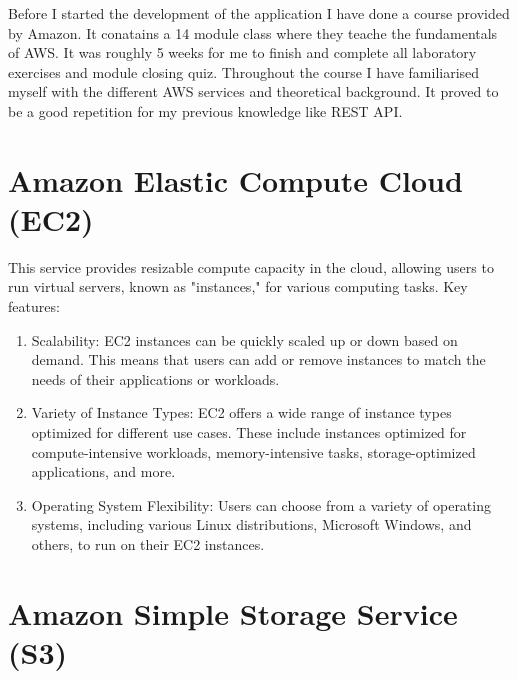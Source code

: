 \documentclass[11pt,a4paper,oneside]{report}
\begin{document}
Before I started the development of the application I have done a course provided by Amazon. It conatains a 14 module class where they teache the fundamentals of AWS.
It was roughly 5 weeks for me to finish and complete all laboratory exercises and module closing quiz. Throughout the course I have familiarised myself with the different AWS services and theoretical background. It proved to be a good repetition for my previous knowledge like REST API. \cite{awsacademy}


\section{Amazon Elastic Compute Cloud (EC2)}

This service provides resizable compute capacity in the cloud, allowing users to run virtual servers, known as "instances," for various computing tasks.
Key features:
\begin{enumerate}
  \item Scalability: EC2 instances can be quickly scaled up or down based on demand. This means that users can add or remove instances to match the needs of their applications or workloads.
  \item Variety of Instance Types: EC2 offers a wide range of instance types optimized for different use cases. These include instances optimized for compute-intensive workloads, memory-intensive tasks, storage-optimized applications, and more.
  \item Operating System Flexibility: Users can choose from a variety of operating systems, including various Linux distributions, Microsoft Windows, and others, to run on their EC2 instances. \cite{awsec2}
\end{enumerate}
\section{Amazon Simple Storage Service (S3)}
\end{document}
